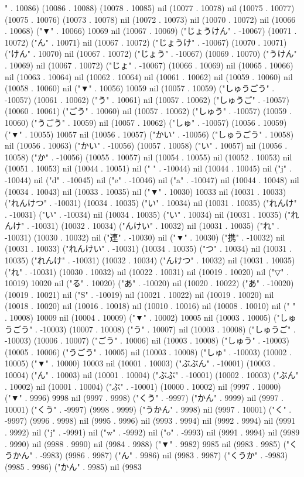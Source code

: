 " . 10086) (10086 . 10088) (10078 . 10085) nil (10077 . 10078) nil (10075 . 10077) (10075 . 10076) (10073 . 10078) nil (10072 . 10073) nil (10070 . 10072) nil (10066 . 10068) ("▼" . 10066) 10069 nil (10067 . 10069) ("じょうけん" . -10067) (10071 . 10072) ("ん" . 10071) nil (10067 . 10072) ("じょうけ" . -10067) (10070 . 10071) ("けん" . 10070) nil (10067 . 10072) ("じょう" . -10067) (10069 . 10070) ("うけん" . 10069) nil (10067 . 10072) ("じょ" . -10067) (10066 . 10069) nil (10065 . 10066) nil (10063 . 10064) nil (10062 . 10064) nil (10061 . 10062) nil (10059 . 10060) nil (10058 . 10060) nil ("▼" . 10056) 10059 nil (10057 . 10059) ("しゅうごう" . -10057) (10061 . 10062) ("う" . 10061) nil (10057 . 10062) ("しゅうご" . -10057) (10060 . 10061) ("ごう" . 10060) nil (10057 . 10062) ("しゅう" . -10057) (10059 . 10060) ("うごう" . 10059) nil (10057 . 10062) ("しゅ" . -10057) (10056 . 10059) ("▼" . 10055) 10057 nil (10056 . 10057) ("かい" . -10056) ("しゅうごう" . 10058) nil (10056 . 10063) ("かい" . -10056) (10057 . 10058) ("い" . 10057) nil (10056 . 10058) ("か" . -10056) (10055 . 10057) nil (10054 . 10055) nil (10052 . 10053) nil (10051 . 10053) nil (10044 . 10051) nil (" " . -10044) nil (10044 . 10045) nil ("j" . -10044) nil ("d" . -10045) nil ("e" . -10046) nil ("a" . -10047) nil (10044 . 10048) nil (10034 . 10043) nil (10033 . 10035) nil ("▼" . 10030) 10033 nil (10031 . 10033) ("れんけつ" . -10031) (10034 . 10035) ("い" . 10034) nil (10031 . 10035) ("れんけ" . -10031) ("い" . -10034) nil (10034 . 10035) ("い" . 10034) nil (10031 . 10035) ("れんけ" . -10031) (10032 . 10034) ("んけい" . 10032) nil (10031 . 10035) ("れ" . -10031) (10030 . 10032) nil ("連" . -10030) nil ("▼" . 10030) ("携" . -10032) nil (10031 . 10033) ("れんけい" . -10031) (10034 . 10035) ("つ" . 10034) nil (10031 . 10035) ("れんけ" . -10031) (10032 . 10034) ("んけつ" . 10032) nil (10031 . 10035) ("れ" . -10031) (10030 . 10032) nil (10022 . 10031) nil (10019 . 10020) nil ("▽" . 10019) 10020 nil ("る" . 10020) ("あ" . -10020) nil (10020 . 10022) ("あ" . -10020) (10019 . 10021) nil ("S" . -10019) nil (10021 . 10022) nil (10019 . 10020) nil (10018 . 10020) nil (10016 . 10018) nil (10010 . 10016) nil (10008 . 10010) nil (" " . 10008) 10009 nil (10004 . 10009) ("▼" . 10002) 10005 nil (10003 . 10005) ("しゅうごう" . -10003) (10007 . 10008) ("う" . 10007) nil (10003 . 10008) ("しゅうご" . -10003) (10006 . 10007) ("ごう" . 10006) nil (10003 . 10008) ("しゅう" . -10003) (10005 . 10006) ("うごう" . 10005) nil (10003 . 10008) ("しゅ" . -10003) (10002 . 10005) ("▼" . 10000) 10003 nil (10001 . 10003) ("ぶぶん" . -10001) (10003 . 10004) ("ん" . 10003) nil (10001 . 10004) ("ぶぶ" . -10001) (10002 . 10003) ("ぶん" . 10002) nil (10001 . 10004) ("ぶ" . -10001) (10000 . 10002) nil (9997 . 10000) ("▼" . 9996) 9998 nil (9997 . 9998) ("くう" . -9997) ("かん" . 9999) nil (9997 . 10001) ("くう" . -9997) (9998 . 9999) ("うかん" . 9998) nil (9997 . 10001) ("く" . -9997) (9996 . 9998) nil (9995 . 9996) nil (9993 . 9994) nil (9992 . 9994) nil (9991 . 9992) nil ("j" . -9991) nil ("w" . -9992) nil ("o" . -9993) nil (9991 . 9994) nil (9989 . 9990) nil (9988 . 9990) nil (9984 . 9988) ("▼" . 9982) 9985 nil (9983 . 9985) ("くうかん" . -9983) (9986 . 9987) ("ん" . 9986) nil (9983 . 9987) ("くうか" . -9983) (9985 . 9986) ("かん" . 9985) nil (9983 